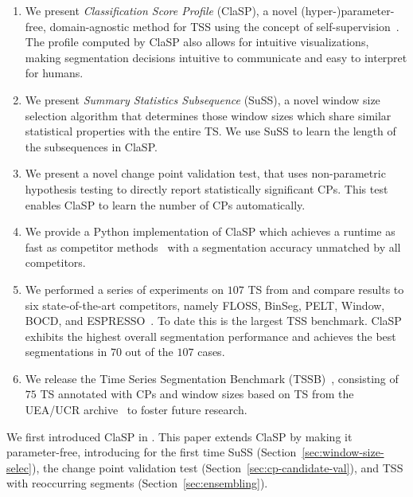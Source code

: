 \documentclass[pdflatex,sn-basic]{sn-jnl}
\begin{document}
\begin{enumerate}
    \item We present \emph{Classification Score Profile} (ClaSP), a novel (hyper-)parameter-free, domain-agnostic method for TSS using the concept of self-supervision~\citep{tsai2020demystifying}. The profile computed by ClaSP also allows for intuitive visualizations, making segmentation decisions intuitive to communicate and easy to interpret for humans.
    
    \item We present \emph{Summary Statistics Subsequence} (SuSS), a novel window size selection algorithm that determines those window sizes which share similar statistical properties with the entire TS. We use SuSS to learn the length of the subsequences in ClaSP.

    \item We present a novel change point validation test, that uses non-parametric hypothesis testing to directly report statistically significant CPs. This test enables ClaSP to learn the number of CPs automatically.

    \item We provide a Python implementation of ClaSP which achieves a runtime as fast as competitor methods~\citep{ClaSPWebpage} with a segmentation accuracy unmatched by all competitors.
    
    \item We performed a series of experiments on $107$ TS from \citep{TSSBWebpage,gharghabi2017matrix} and compare results to six state-of-the-art competitors, namely FLOSS, BinSeg, PELT, Window, BOCD, and ESPRESSO~\citep{gharghabi2017matrix,truong2020selective,adams2007bayesian,Deldari2020ESPRESSOEA}. To date this is the largest TSS benchmark. ClaSP exhibits the highest overall segmentation performance and achieves the best segmentations in $70$ out of the $107$ cases.
    
    \item We release the Time Series Segmentation Benchmark (TSSB)~\citep{TSSBWebpage}, consisting of $75$ TS annotated with CPs and window sizes based on TS from the UEA/UCR  archive~\citep{UCRClassification} to foster future research.
\end{enumerate}

We first introduced ClaSP in \citep{Schfer2021ClaSPT}. This paper extends ClaSP by making it parameter-free, introducing for the first time SuSS (Section~\ref{sec:window-size-selec}), the change point validation test (Section~\ref{sec:cp-candidate-val}), and TSS with reoccurring segments (Section~\ref{sec:ensembling}).
\end{document}
